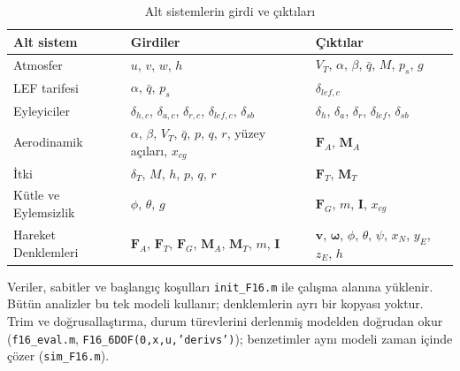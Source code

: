 \documentclass[conf]{new-aiaa}
\begin{document}
\begin{table}[hbt!]
\caption{\label{tab:io} Alt sistemlerin girdi ve çıktıları}
\centering
\small
\begin{tabular}{lll}
\toprule
Alt sistem & Girdiler & Çıktılar \\
\midrule
Atmosfer & $u$, $v$, $w$, $h$ & $V_T$, $\alpha$, $\beta$, $\bar q$, $M$, $p_s$, $g$ \\
LEF tarifesi & $\alpha$, $\bar q$, $p_s$ & $\delta_{lef,c}$ \\
Eyleyiciler & $\delta_{h,c}$, $\delta_{a,c}$, $\delta_{r,c}$, $\delta_{lef,c}$, $\delta_{sb}$ & $\delta_h$, $\delta_a$, $\delta_r$, $\delta_{lef}$, $\delta_{sb}$ \\
Aerodinamik & $\alpha$, $\beta$, $V_T$, $\bar q$, $p$, $q$, $r$, yüzey açıları, $x_{cg}$ & $\mathbf F_A$, $\mathbf M_A$ \\
İtki & $\delta_T$, $M$, $h$, $p$, $q$, $r$ & $\mathbf F_T$, $\mathbf M_T$ \\
Kütle ve Eylemsizlik & $\phi$, $\theta$, $g$ & $\mathbf F_G$, $m$, $\mathbf I$, $x_{cg}$ \\
Hareket Denklemleri & $\mathbf F_A$, $\mathbf F_T$, $\mathbf F_G$, $\mathbf M_A$, $\mathbf M_T$, $m$, $\mathbf I$ & $\mathbf v$, $\boldsymbol\omega$, $\phi$, $\theta$, $\psi$, $x_N$, $y_E$, $z_E$, $h$ \\
\bottomrule
\end{tabular}
\end{table}

Veriler, sabitler ve başlangıç koşulları \texttt{init\_F16.m} ile çalışma alanına yüklenir. Bütün analizler bu tek modeli kullanır; denklemlerin ayrı bir kopyası yoktur. Trim ve doğrusallaştırma, durum türevlerini derlenmiş modelden doğrudan okur (\texttt{f16\_eval.m}, \texttt{F16\_6DOF(0,x,u,'derivs')}); benzetimler aynı modeli zaman içinde çözer (\texttt{sim\_F16.m}).
\end{document}

